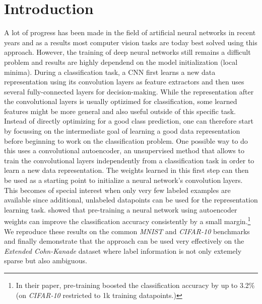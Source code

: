 \documentclass{article}
\begin{document}
\section{Introduction}
  A lot of progress has been made in the field of artificial neural networks in recent years and as a results most computer vision tasks are today best solved using this approach. However, the training of deep neural networks still remains a difficult problem and results are highly dependend on the model initialization (local minima). 
  During a classification task, a CNN first learns a new data representation using its convolution layers as feature extractors and then uses several fully-connected layers for decision-making. 
  While the representation after the convolutional layers is usually optizimed for classification, some learned features might be more general and also useful outside of this specific task. 
  Instead of directly optimizing for a good class prediction, one can therefore start by focussing on the intermediate goal of learning a good data representation before beginning to work on the classification problem.
  One possible way to do this uses a convolutional autoencoder, an unsupervised method that allows to train the convolutional layers independently from a classification task in order to learn a new data representation. 
  The weights learned in this first step can then be used as a starting point to initialize a neural network's convolution layers. 
  This becomes of special interest when only very few labeled examples are available since additional, unlabeled datapoints can be used for the representation learning task. 
  \citep{masci2011stacked} showed that pre-training a neural network using autoencoder weights can improve the classification accuracy consistently by a small margin.\footnote{In their paper, pre-training boosted the classification accuracy by up to 3.2\% (on \emph{CIFAR-10} restricted to 1k training datapoints.)}
  We reproduce these results on the common \emph{MNIST} \citep{lecun1998mnist} and \emph{CIFAR-10} \citep{krizhevsky2009learning} benchmarks and finally demonstrate that the approach can be used very effectively on the \emph{Extended Cohn-Kanade} \citep{kanade2000comprehensive,lucey2010extended} dataset where label information is not only extemely sparse but also ambiguous. 
\end{document}

